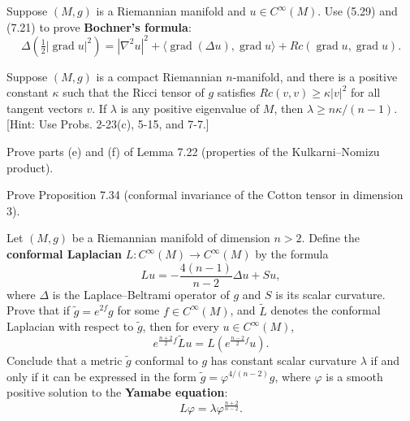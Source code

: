 \begin{exercise}
\label{prob:bochner-formula}
Suppose $(M, g)$ is a Riemannian manifold and $u \in C^\infty(M)$. Use (5.29) and (7.21) to prove \textbf{Bochner's formula}:
\[
\Delta\left(\tfrac{1}{2} |\operatorname{grad} u|^2\right) = |\nabla^2 u|^2 + \langle \operatorname{grad}(\Delta u), \operatorname{grad} u \rangle + Rc(\operatorname{grad} u, \operatorname{grad} u).
\]
\end{exercise}

\begin{exercise}
\label{prob:lichnerowicz-theorem}
Suppose $(M, g)$ is a compact Riemannian $n$-manifold, and there is a positive constant $\kappa$ such that the Ricci tensor of $g$ satisfies $Rc(v, v) \geq \kappa|v|^2$ for all tangent vectors $v$. If $\lambda$ is any positive eigenvalue of $M$, then $\lambda \geq n\kappa/(n-1)$. [Hint: Use Probs. 2-23(c), 5-15, and 7-7.]
\end{exercise}

\begin{exercise}
\label{prob:kulkarni-nomizu-properties}
Prove parts (e) and (f) of Lemma 7.22 (properties of the Kulkarni--Nomizu product).
\end{exercise}

\begin{exercise}
\label{prob:cotton-tensor-conformal}
Prove Proposition 7.34 (conformal invariance of the Cotton tensor in dimension 3).
\end{exercise}

\begin{exercise}
\label{prob:conformal-laplacian-yamabe}
Let $(M, g)$ be a Riemannian manifold of dimension $n > 2$. Define the \textbf{conformal Laplacian} $L: C^\infty(M) \to C^\infty(M)$ by the formula
\[
Lu = -\frac{4(n-1)}{n-2} \Delta u + Su,
\]
where $\Delta$ is the Laplace--Beltrami operator of $g$ and $S$ is its scalar curvature. Prove that if $\tilde{g} = e^{2f} g$ for some $f \in C^\infty(M)$, and $\tilde{L}$ denotes the conformal Laplacian with respect to $\tilde{g}$, then for every $u \in C^\infty(M)$,
\[
e^{\frac{n+2}{2}f} \tilde{L}u = L\left(e^{\frac{n-2}{2}f} u\right).
\]
Conclude that a metric $\tilde{g}$ conformal to $g$ has constant scalar curvature $\lambda$ if and only if it can be expressed in the form $\tilde{g} = \varphi^{4/(n-2)} g$, where $\varphi$ is a smooth positive solution to the \textbf{Yamabe equation}:
\begin{equation}
L\varphi = \lambda \varphi^{\frac{n+2}{n-2}}.
\tag{7.59}
\end{equation}
\end{exercise}

